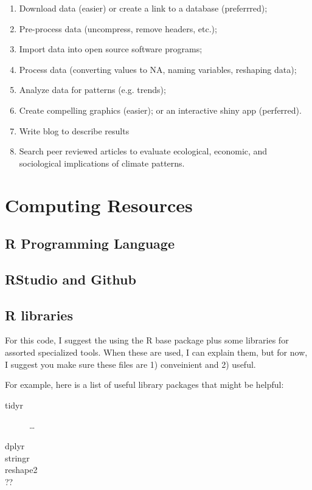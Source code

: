\documentclass{article}\usepackage[]{graphicx}\usepackage[]{color}
\begin{document}
\begin{enumerate}
  \item Download data (easier) or create a link to a database (preferrred);
  \item Pre-process data (uncompress, remove headers, etc.);
  \item Import data into open source software programs;
  \item Process data (converting values to NA, naming variables, reshaping data);
  \item Analyze data for patterns (e.g. trends);
  \item Create compelling graphics (easier); or an interactive shiny app (perferred).
  \item Write blog to describe results
  \item Search peer reviewed articles to evaluate ecological, economic, and sociological implications of climate patterns.
  
\end{enumerate}

\section{Computing Resources}

\subsection{R Programming Language}

\subsection{RStudio and Github}

\subsection{R libraries}

For this code, I suggest the using the R base package plus some libraries for assorted specialized tools. When these are used, I can explain them, but for now, I suggest you make sure these files are 1) conveinient and 2) useful. 

For example, here is a list of useful library packages that might be helpful:

\begin{description}
  \item[tidyr] \ldots
  \item[dplyr]
  \item[stringr]
  \item[reshape2]
  \item[??]
\end{description}
\end{document}
